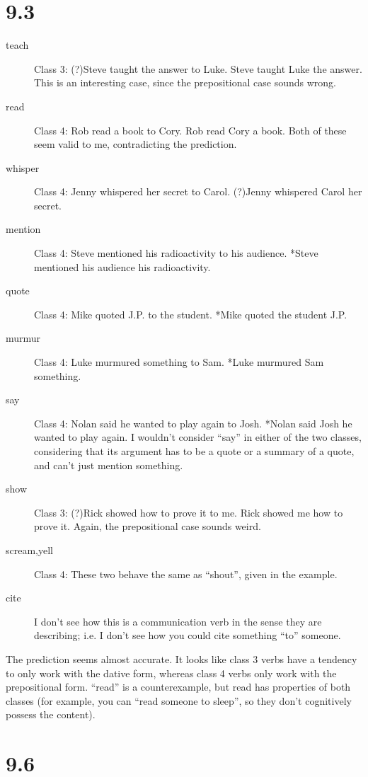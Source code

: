 \documentclass[12pt]{article}
\begin{document}
\section*{9.3}
\begin{description}
\item[teach] Class 3: (?)Steve taught the answer to Luke.  Steve taught
Luke the answer.  This is an interesting case, since the prepositional
case sounds wrong.
\item[read] Class 4: Rob read a book to Cory.  Rob read Cory a book.
Both of these seem valid to me, contradicting the prediction.
\item[whisper] Class 4: Jenny whispered her secret to Carol.  (?)Jenny
whispered Carol her secret.
\item[mention] Class 4: Steve mentioned his radioactivity to his
audience.  *Steve mentioned his audience his radioactivity.
\item[quote] Class 4: Mike quoted J.P. to the student.  *Mike quoted the
student J.P.
\item[murmur] Class 4: Luke murmured something to Sam.  *Luke murmured
Sam something.
\item[say] Class 4: Nolan said he wanted to play again to Josh.  *Nolan
said Josh he wanted to play again.  I wouldn't consider ``say'' in
either of the two classes, considering that its argument has to be a
quote or a summary of a quote, and can't just mention something.
\item[show] Class 3: (?)Rick showed how to prove it to me.  Rick showed
me how to prove it.  Again, the prepositional case sounds weird.
\item[scream,yell] Class 4: These two behave the same as ``shout'', given in the
example.
\item[cite] I don't see how this is a communication verb in the sense
they are describing; i.e. I don't see how you could cite something
``to'' someone.
\end{description}

The prediction seems almost accurate.  It looks like class 3 verbs have
a tendency to only work with the dative form, whereas class 4 verbs only
work with the prepositional form.  ``read'' is a counterexample, but
read has properties of both classes (for example, you can ``read someone
to sleep'', so they don't cognitively possess the content).

\section*{9.6}
\end{document}
